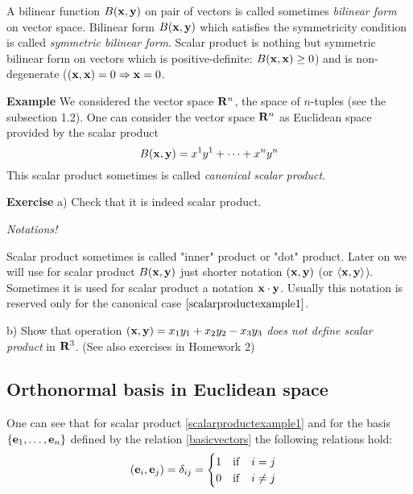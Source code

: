 \documentclass[12pt]{article}
\numberwithin{equation}{section}
\begin{document}
{\footnotesize A bilinear function  $B({\bf x},{\bf y})$ on pair of vectors is called sometimes {\it bilinear form} on
vector space. Bilinear form $B({\bf x},{\bf y})$  which satisfies the symmetricity condition is called
{\it symmetric bilinear form}.  Scalar product is nothing but symmetric bilinear form on vectors
which is positive-definite: $B({\bf x},{\bf x})\geq 0$) and is non-degenerate ($({\bf x},{\bf x})= 0\Rightarrow  {\bf x}=0$}.

\medskip



\medskip


{\bf Example} We considered the vector space ${\bf R}^n$, the space of $n$-tuples (see the subsection 1.2).
 One can consider the vector space ${\bf R}^n$ as Euclidean space provided by the scalar product
         \begin{equation}\label{scalarproductexample1}
                    B({\bf x},{\bf y})=x^1y^1+\dots+x^ny^n
                \end{equation}
This scalar product sometimes is called {\it canonical scalar product}.

\smallskip

{\bf Exercise}  a) Check that it is indeed scalar product.



\centerline {\it Notations!}

Scalar product sometimes is called "inner" product
 or "dot" product.
Later on we will use for scalar product $B({\bf x},{\bf y})$ just shorter notation
$({\bf x},{\bf y})$ (or $\langle{\bf x},{\bf y}\rangle$).
Sometimes it is used for scalar product a notation ${\bf x} \cdot {\bf y}$.
Usually this notation is reserved only for
the canonical case $\eqref{scalarproductexample1}$.


b) Show that operation $({\bf x},{\bf y})=x_1y_1+x_2y_2-x_3y_3$ {\it does not define scalar product} in ${\bf R}^3$.
(See also exercises in Homework 2)





\subsection {Orthonormal basis in Euclidean space}

One can see that for scalar product  \eqref{scalarproductexample1}
and for the basis $\{{\bf e}_1,\dots,{\bf e}_n\}$ defined by the relation \eqref{basicvectors}
the following relations hold:
\begin{equation}\label{orthonormalbasis}
    ({\bf e}_i,{\bf e}_j)=\delta_{ij}= \begin {cases}
                  1\quad {\rm if}\quad i=j\\
              0\quad {\rm if}\quad i\not=j
                         \end{cases}
\end{equation}
\end{document}
